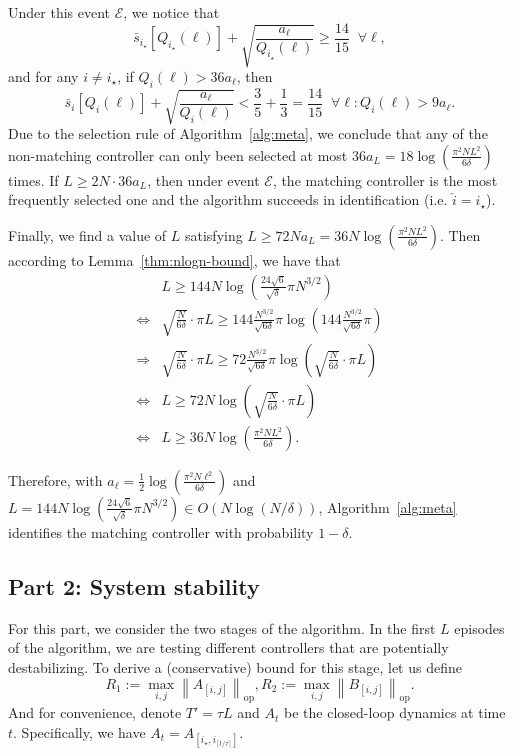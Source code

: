\documentclass[11pt, twoside]{article}
\theoremstyle{definition}
\newcommand{\norm}[1]{\left\lVert #1 \right\rVert}
\newcommand{\opnorm}[1]{\norm{#1}_{\mathrm{op}}}
\begin{document}
Under this event $\mathcal{E}$, we notice that 
\[\bar{s}_{i_\star}[Q_{i_\star}(\ell)] + \sqrt{\frac{a_\ell}{Q_{i_\star}(\ell)}} \ge \frac{14}{15} \;\; \forall \ell,\]
and for any $i \neq i_\star$, if $Q_i(\ell) > 36 a_\ell$, then
\[\bar{s}_{i}[Q_i(\ell)] + \sqrt{\frac{a_\ell}{Q_i(\ell)}} < \frac{3}{5} + \frac{1}{3} = \frac{14}{15} \;\; \forall \ell: Q_i(\ell) > 9 a_\ell.\]
Due to the selection rule of Algorithm~\ref{alg:meta}, we conclude that any of the non-matching controller can only been selected at most $36 a_L = 18 \log(\frac{\pi^2 N L^2}{6\delta})$ times.
If $L \ge 2 N \cdot 36 a_L$, then under event $\mathcal{E}$, the matching controller is the most frequently selected one and the algorithm succeeds in identification (i.e. $\hat{i} = i_\star$).

Finally, we find a value of $L$ satisfying $L \ge 72N a_L = 36 N \log(\frac{\pi^2 N L^2}{6\delta})$.
Then according to Lemma~\ref{thm:nlogn-bound}, we have that
\begin{align*}
    & L \ge 144 N \log\left(\frac{24\sqrt{6}}{\sqrt{\delta}} \pi N^{3/2}\right) \\
    \Leftrightarrow{}& \sqrt{\frac{N}{6\delta}} \cdot \pi L \ge 144 \frac{N^{3/2}}{\sqrt{6\delta}} \pi \log\left(144 \frac{N^{3/2}}{\sqrt{6\delta}} \pi\right) \\
    \Rightarrow{}& \sqrt{\frac{N}{6\delta}} \cdot \pi L \ge 72 \frac{N^{3/2}}{\sqrt{6\delta}} \pi \log\left(\sqrt{\frac{N}{6\delta}} \cdot \pi L\right) \\
    \Leftrightarrow{}& L \ge 72 N \log\left(\sqrt{\frac{N}{6\delta}} \cdot \pi L\right)\\
    \Leftrightarrow{}& L \ge 36N \log\left(\frac{\pi^2 N L^2}{6\delta}\right).
\end{align*}

Therefore, with $a_\ell = \frac{1}{2} \log(\frac{\pi^2 N \ell^2}{6\delta})$ and $L = 144 N \log\left(\frac{24\sqrt{6}}{\sqrt{\delta}} \pi N^{3/2}\right) \in O(N \log (N/\delta))$, Algorithm~\ref{alg:meta} identifies the matching controller with probability $1-\delta$.

\subsection*{Part 2: System stability}
For this part, we consider the two stages of the algorithm.
In the first $L$ episodes of the algorithm, we are testing different controllers that are potentially destabilizing.
To derive a (conservative) bound for this stage, let us define
\[R_1 := \max_{i, j} \opnorm{A_{[i,j]}}, R_2 := \max_{i, j} \opnorm{B_{[i,j]}}.\]
And for convenience, denote $T' = \tau L$ and $A_t$ be the closed-loop dynamics at time $t$.
Specifically, we have $A_t = A_{[i_\star, i_{\lceil t / \tau \rceil}]}$.
\end{document}
